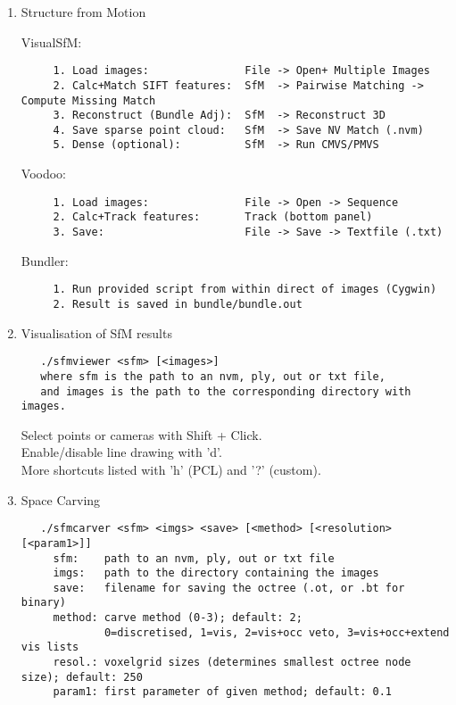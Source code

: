 \begin{enumerate}
\item Structure from Motion

   VisualSfM:
   \begin{verbatim}
     1. Load images:               File -> Open+ Multiple Images
     2. Calc+Match SIFT features:  SfM  -> Pairwise Matching -> Compute Missing Match
     3. Reconstruct (Bundle Adj):  SfM  -> Reconstruct 3D
     4. Save sparse point cloud:   SfM  -> Save NV Match (.nvm)
     5. Dense (optional):          SfM  -> Run CMVS/PMVS
   \end{verbatim}

   Voodoo:
   \begin{verbatim}
     1. Load images:               File -> Open -> Sequence
     2. Calc+Track features:       Track (bottom panel)
     3. Save:                      File -> Save -> Textfile (.txt)
   \end{verbatim}

   Bundler:
   \begin{verbatim}
     1. Run provided script from within direct of images (Cygwin)
     2. Result is saved in bundle/bundle.out
   \end{verbatim}


\item Visualisation of SfM results

   \begin{verbatim}
   ./sfmviewer <sfm> [<images>]
   where sfm is the path to an nvm, ply, out or txt file,
   and images is the path to the corresponding directory with images.
   \end{verbatim}

   Select points or cameras with Shift + Click. \\
   Enable/disable line drawing with 'd'. \\
   More shortcuts listed with 'h' (PCL) and '?' (custom).


\pagebreak
\item Space Carving

   \begin{verbatim}
   ./sfmcarver <sfm> <imgs> <save> [<method> [<resolution> [<param1>]]
     sfm:    path to an nvm, ply, out or txt file
     imgs:   path to the directory containing the images
     save:   filename for saving the octree (.ot, or .bt for binary)
     method: carve method (0-3); default: 2;
             0=discretised, 1=vis, 2=vis+occ veto, 3=vis+occ+extend vis lists
     resol.: voxelgrid sizes (determines smallest octree node size); default: 250
     param1: first parameter of given method; default: 0.1
   \end{verbatim}



\end{enumerate}
